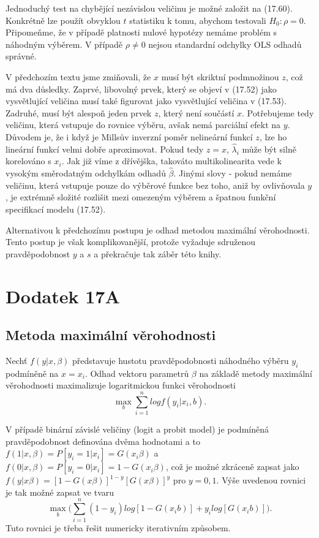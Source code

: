 Jednoduchý test na chybějící nezávislou veličinu je možné založit na (17.60). Konkrétně lze použít obvyklou $t$ statistiku k tomu, abychom testovali $H_0: \rho = 0$. Připomeňme, že v případě platnosti nulové hypotézy nemáme problém s náhodným výběrem. V případě $\rho \ne 0$ nejsou standardní odchylky OLS odhadů správné.

V předchozím textu jsme zmiňovali, že $x$ musí být skriktní podmnožinou $z$, což má dva důsledky. Zaprvé, libovolný prvek, který se objeví  v (17.52) jako vysvětlující veličina musí také figurovat jako vysvětlující veličina v (17.53). Zadruhé, musí být alespoň jeden prvek $z$, který není součástí $x$. Potřebujeme tedy veličinu, která vstupuje do rovnice výběru, avšak nemá parciální efekt na $y$. Důvodem je, že i když je Millsův inverzní poměr nelineární funkcí $z$, lze ho lineární funkcí velmi dobře aproximovat. Pokud tedy $z = x$, $\hat{\lambda}_i$ může být silně korelováno s $x_i$. Jak již víme z dřívějška, takováto multikolinearita vede k vysokým směrodatným odchylkám odhadů $\hat{\beta}$. Jinými slovy - pokud nemáme veličinu, která vstupuje pouze do výběrové funkce bez toho, aniž by ovlivňovala $y$, je extrémně složité rozlišit mezi omezeným výběrem a špatnou funkční specifikací modelu (17.52).

Alternativou k předchozímu postupu je odhad metodou maximální věrohodnosti. Tento postup je však komplikovanější, protože vyžaduje sdruženou pravděpodobnost $y$ a $s$ a překračuje tak záběr této knihy.

\section{Dodatek 17A}

\subsection{Metoda maximální věrohodnosti}

Nechť $f(y|x,\beta)$ představuje hustotu pravděpodobnosti náhodného výběru $y_i$ podmíněně na $x = x_i$. Odhad vektoru parametrů $\beta$ na základě metody maximální věrohodnosti maximalizuje logaritmickou funkci věrohodnosti
\begin{equation}
\max_{b} \sum_{i = 1}^n log f(y_i|x_i, b).
\end{equation}

V případě binární závislé veličiny (logit a probit model) je podmíněná pravděpodobnost definována dvěma hodnotami a to $f(1|x, \beta) = P[y_i = 1 | x_i] = G(x_i\beta)$ a $f(0|x,\beta) = P[y_i = 0 | x_i] = 1 - G(x_i \beta)$, což je možné zkráceně zapsat jako $f(y|x \beta) = [1 - G(x\beta)]^{1 - y}[G(x\beta)]^y$ pro $y = 0, 1$. Výše uvedenou rovnici je tak možné zapsat ve tvaru
\begin{equation}
\max_{b} \Big(\sum_{i = 1}^n (1 - y_i)log[1 - G(x_i b)] + y_i log[G(x_i b)]\Big).
\end{equation}
Tuto rovnici je třeba řešit numericky iterativním způsobem.

